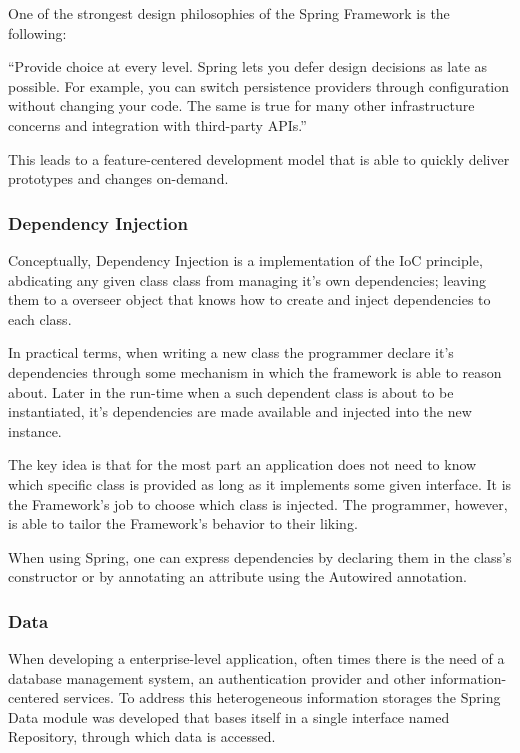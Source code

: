 One of the strongest design philosophies of the Spring Framework is the following:
\begin{displayquote}
``Provide choice at every level. Spring lets you defer design decisions as late as possible. For example, you can switch persistence providers through configuration without changing your code. The same is true for many other infrastructure concerns and integration with third-party \gls{API}s.''~\cite{springdocs}
\end{displayquote}
This leads to a feature-centered development model that is able to quickly deliver prototypes and changes on-demand.

\subsubsection{Dependency Injection}
Conceptually, Dependency Injection is a implementation of the \gls{IoC} principle, abdicating any given class class from managing it's own dependencies; leaving them to a overseer object that knows how to create and inject dependencies to each class\cite{inversion}.

In practical terms, when writing a new class the programmer declare it's dependencies through some mechanism in which the framework is able to reason about. Later in the run-time when a such dependent class is about to be instantiated, it's dependencies are made available and injected into the new instance.

The key idea is that for the most part an application does not need to know which specific class is provided as long as it implements some given interface. It is the Framework's job to choose which class is injected. The programmer, however, is able to tailor the Framework's behavior to their liking.

When using Spring, one can express dependencies by declaring them in the class's constructor or by annotating an attribute using the Autowired annotation\cite{springdi}.

\subsubsection{Data}
When developing a enterprise-level application, often times there is the need of a database management system, an authentication provider and other information-centered services. To address this heterogeneous information storages the Spring Data module was developed that bases itself in a single interface named Repository, through which data is accessed\cite{springdata}.

